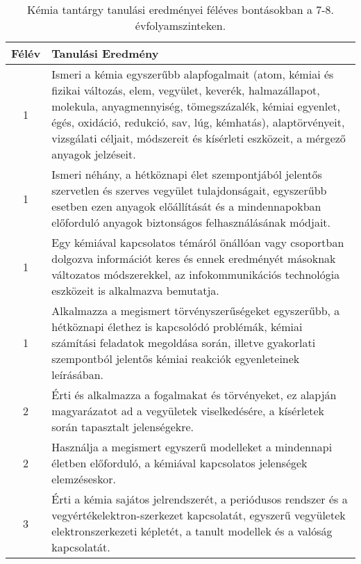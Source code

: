        
           \begin{longtable}{c | p{12cm} }
            \caption[Kémia 7-8.]{Kémia tantárgy tanulási eredményei féléves bontásokban a 7-8. évfolyamszinteken. }  \\

            \textbf{Félév} & \textbf{Tanulási Eredmény} \\
            \hline
            \endhead
                                
                                          1 &  Ismeri a kémia egyszerűbb alapfogalmait (atom, kémiai és fizikai változás, elem, vegyület, keverék, halmazállapot, molekula, anyagmennyiség, tömegszázalék, kémiai egyenlet, égés, oxidáció, redukció, sav, lúg, kémhatás), alaptörvényeit, vizsgálati céljait, módszereit és kísérleti eszközeit, a mérgező anyagok jelzéseit. \\ \hline
                                          1 &  Ismeri néhány, a hétköznapi élet szempontjából jelentős szervetlen és szerves vegyület tulajdonságait, egyszerűbb esetben ezen anyagok előállítását és a mindennapokban előforduló anyagok biztonságos felhasználásának módjait. \\ \hline
                                          1 &  Egy kémiával kapcsolatos témáról önállóan vagy csoportban dolgozva információt keres és ennek eredményét másoknak változatos módszerekkel, az infokommunikációs technológia eszközeit is alkalmazva bemutatja. \\ \hline
                                          1 &  Alkalmazza a megismert törvényszerűségeket egyszerűbb, a hétköznapi élethez is kapcsolódó problémák, kémiai számítási feladatok megoldása során, illetve gyakorlati szempontból jelentős kémiai reakciók egyenleteinek leírásában. \\ \hline
                                      
                                
                                          2 &  Érti és alkalmazza a fogalmakat és törvényeket, ez alapján magyarázatot ad a vegyületek viselkedésére, a kísérletek során tapasztalt jelenségekre. \\ \hline
                                          2 &  Használja a megismert egyszerű modelleket a mindennapi életben előforduló, a kémiával kapcsolatos jelenségek elemzéseskor. \\ \hline
                                      
                                
                                          3 &  Érti a kémia sajátos jelrendszerét, a periódusos rendszer és a vegyértékelektron-szerkezet kapcsolatát, egyszerű vegyületek elektronszerkezeti képletét, a tanult modellek és a valóság kapcsolatát. \\ \hline
                                      

\end{longtable}
